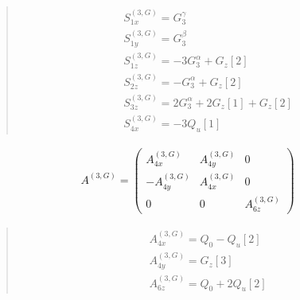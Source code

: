 \documentclass[fleqn,10pt]{jsarticle}
\begin{document}
\begin{quote}
\begin{align*}
& S^{(3,G)}_{1x} = G_{3}^{\gamma} \\
& S^{(3,G)}_{1y} = G_{3}^{\beta} \\
& S^{(3,G)}_{1z} = - 3 G_{3}^{\alpha} + G_{z}[2] \\
& S^{(3,G)}_{2z} = - G_{3}^{\alpha} + G_{z}[2] \\
& S^{(3,G)}_{3z} = 2 G_{3}^{\alpha} + 2 G_{z}[1] + G_{z}[2] \\
& S^{(3,G)}_{4x} = - 3 Q_{u}[1]
\end{align*}
\end{quote}
\begin{align*}
A^{(3,G)} = \begin{pmatrix} A^{(3,G)}_{4x} & A^{(3,G)}_{4y} & 0 \\ - A^{(3,G)}_{4y} & A^{(3,G)}_{4x} & 0 \\ 0 & 0 & A^{(3,G)}_{6z} \end{pmatrix}
\end{align*}
\begin{quote}
\begin{align*}
& A^{(3,G)}_{4x} = Q_{0} - Q_{u}[2] \\
& A^{(3,G)}_{4y} = G_{z}[3] \\
& A^{(3,G)}_{6z} = Q_{0} + 2 Q_{u}[2]
\end{align*}
\end{quote}
\end{document}
